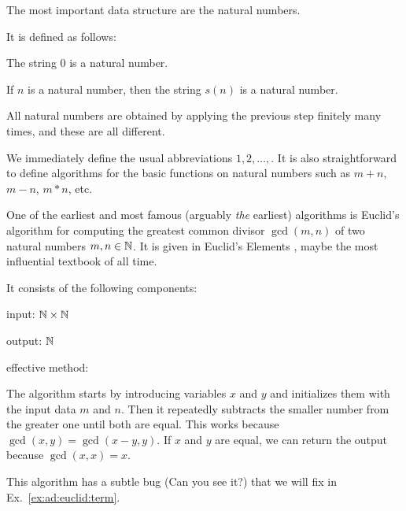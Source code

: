 \begin{example}
The most important data structure are the natural numbers.

It is defined as follows:
\begin{compactitem}
 \item The string $0$ is a natural number.
 \item If $n$ is a natural number, then the string $s(n)$ is a natural number.
 \item All natural numbers are obtained by applying the previous step finitely many times, and these are all different.
\end{compactitem}

We immediately define the usual abbreviations $1,2,\ldots,$.
It is also straightforward to define algorithms for the basic functions on natural numbers such as $m+n$, $m-n$, $m*n$, etc.
\end{example}

\begin{example}\label{ex:ad:euclid}
One of the earliest and most famous (arguably \emph{the} earliest) algorithms is Euclid's algorithm for computing the greatest common divisor $\gcd(m,n)$ of two natural numbers $m,n\in\mathbb{N}$.
It is given in Euclid's Elements \cite[Book VII, Proposition 2]{elements}, maybe the most influential textbook of all time.

It consists of the following components:
\begin{compactitem}
\item input: $\mathbb{N}\times\mathbb{N}$
\item output: $\mathbb{N}$
\item effective method:
\begin{acode}
\end{acode}
\end{compactitem}

The algorithm starts by introducing variables $x$ and $y$ and initializes them with the input data $m$ and $n$.
Then it repeatedly subtracts the smaller number from the greater one until both are equal.
This works because $\gcd(x,y)=\gcd(x-y,y)$.
If $x$ and $y$ are equal, we can return the output because $\gcd(x,x)=x$.
\medskip

This algorithm has a subtle bug (Can you see it?) that we will fix in Ex.~\ref{ex:ad:euclid:term}.
\end{example}

